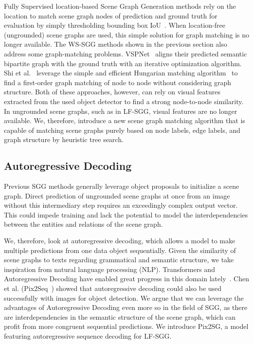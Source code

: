 \documentclass[10pt,twocolumn,letterpaper]{article}
\begin{document}
Fully Supervised location-based Scene Graph Generation methods rely on the location to match scene graph nodes of prediction and ground truth for evaluation by simply thresholding bounding box IoU~\cite{xu_scene_2017}. When location-free (ungrounded) scene graphs are used, this simple solution for graph matching is no longer available.
The WS-SGG methods shown in the previous section also address some graph-matching problems. VSPNet~\cite{zareian_weakly_2020} aligns their predicted semantic bipartite graph with the ground truth with an iterative optimization algorithm. Shi et al.~\cite{shi_simple_2021} leverage the simple and efficient Hungarian matching algorithm~\cite{kuhn_hungarian_1955} to find a first-order graph matching of node to node without considering graph structure. Both of these approaches, however, can rely on visual features extracted from the used object detector to find a strong node-to-node similarity. In ungrounded scene graphs, such as in LF-SGG, visual features are no longer available. We, therefore, introduce a new scene graph matching algorithm that is capable of matching scene graphs purely based on node labels, edge labels, and graph structure by heuristic tree search.
\subsection{Autoregressive Decoding}
Previous SGG methods generally leverage object proposals to initialize a scene graph. Direct prediction of ungrounded scene graphs at once from an image without this intermediary step requires an exceedingly complex output vector. This could impede training and lack the potential to model the interdependencies between the entities and relations of the scene graph. 

We, therefore, look at autoregressive decoding, which allows a model to make multiple predictions from one data object sequentially. Given the similarity of scene graphs to texts regarding grammatical and semantic structure, we take inspiration from natural language processing (NLP).
Transformers and Autoregressive Decoding have enabled great progress in this domain lately~\cite{devlin_bert_2019, alayrac_flamingo_2022, brown_language_2020}. Chen et al. (Pix2Seq~\cite{chen_pix2seq_2022}) showed that autoregressive decoding could also be used successfully with images for object detection. We argue that we can leverage the advantages of Autoregressive Decoding even more so in the field of SGG, as there are interdependencies in the semantic structure of the scene graph, which can profit from more congruent sequential predictions. We introduce Pix2SG, a model featuring autoregressive sequence decoding for LF-SGG.
\end{document}
